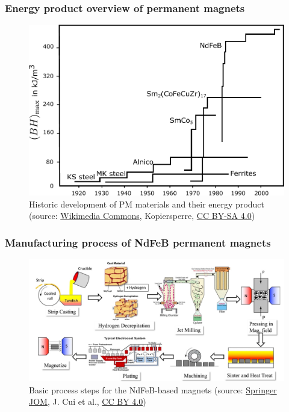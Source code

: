 \begin{frame}
	\frametitle{Energy product overview of permanent magnets}
        \begin{figure}
            \centering
            \includegraphics[height=0.65\textheight]{fig/lec02/PM_energy_product.pdf}
            \caption{Historic development of PM materials and their energy product (source: \href{https://commons.wikimedia.org/wiki/File:Magnetische_Energiedichte.svg}{Wikimedia Commons}, Kopiersperre, \href{https://creativecommons.org/licenses/by-sa/4.0/deed.en}{CC BY-SA 4.0})}
        \end{figure}
\end{frame}


\begin{frame}
	\frametitle{Manufacturing process of NdFeB permanent magnets}
        \begin{figure}
            \centering
            \includegraphics[height=0.65\textheight]{fig/lec02/Production_process_NdFeB_magnets.png}
            \caption{Basic process steps for the NdFeB-based magnets (source: \href{https://link.springer.com/article/10.1007/S11837-022-05156-9}{Springer JOM}, J. Cui et al., \href{https://creativecommons.org/licenses/by/4.0/}{CC BY 4.0})}
        \end{figure}
\end{frame}

